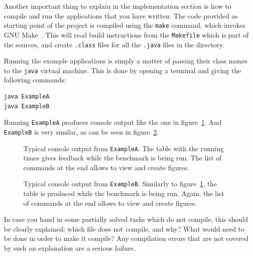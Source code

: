 \documentclass[a4paper,10pt]{article}
\begin{document}
Another important thing to explain in the implementation section is how to compile and run the applications that you have written.
The code provided as starting point of the project is compiled using the \texttt{make} command, which invokes GNU Make~\cite{gnu-make}.
This will read build instructions from the \texttt{Makefile} which is part of the sources, and create \texttt{.class} files for all the \texttt{.java} files in the directory.

Running the example applications is simply a matter of passing their class names to the \texttt{java} virtual machine.
This is done by opening a terminal and giving the following commands:

\begin{verbatim}
java ExampleA
java ExampleB
\end{verbatim}

Running \texttt{ExampleA} produces console output like the one in figure~\ref{fig:exa-console}.
And \texttt{ExampleB} is very similar, as can be seen in figure~\ref{fig:exb-console}.

\begin{figure}
  \centering
  \caption{
    Typical console output from \texttt{ExampleA}.
    The table with the running times gives feedback while the benchmark is being run.
    The list of commands at the end allows to view and create figures.
  }\label{fig:exa-console}
\end{figure}

\begin{figure}
  \centering
  \caption{
    Typical console output from \texttt{ExampleB}.
    Similarly to figure~\ref{fig:exa-console}, the table is produced while the benchmark is being run.
    Again, the list of commands at the end allows to view and create figures.
  }\label{fig:exb-console}
\end{figure}

In case you hand in some partially solved tasks which do not compile, this should be clearly explained: which file does not compile, and why?
What would need to be done in order to make it compile?
Any compilation errors that are not covered by such an explanation are a serious failure.
\end{document}
